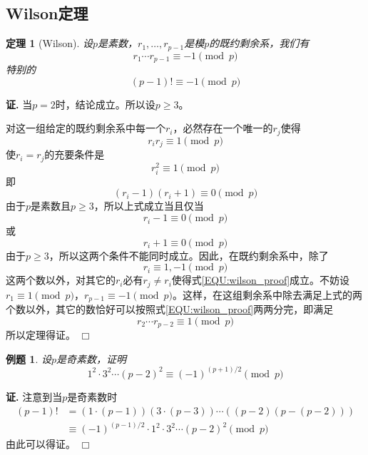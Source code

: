 \documentclass{ctexart}
\newtheorem{thrm}{定理}[section]
\newtheorem{exmp}{例题}[section]
\renewenvironment{proof}[1][证]{\noindent \textbf{#1.} }{\hfill$\Box$}
\begin{document}
\subsection{Wilson定理}
\begin{thrm}[Wilson]
设$p$是素数，$r_1,\dotsc,r_{p-1}$是模$p$的既约剩余系，我们有
\begin{displaymath}
r_1\dotsm r_{p-1}\equiv -1\pmod{p}
\end{displaymath}
特别的
\begin{displaymath}
(p-1)!\equiv -1\pmod{p}
\end{displaymath}
\end{thrm}
\begin{proof}
当$p=2$时，结论成立。所以设$p\geq 3$。

对这一组给定的既约剩余系中每一个$r_i$，必然存在一个唯一的$r_j$使得
\begin{equation}\label{EQU:wilson_proof}
r_i r_j\equiv 1\pmod{p}
\end{equation}
使$r_i=r_j$的充要条件是
\begin{displaymath}
r_i^2\equiv 1\pmod{p}
\end{displaymath}
即
\begin{displaymath}
(r_i-1)(r_i+1)\equiv 0\pmod{p}
\end{displaymath}
由于$p$是素数且$p\geq 3$，所以上式成立当且仅当
\begin{displaymath}
r_i-1\equiv 0\pmod{p}
\end{displaymath}
或
\begin{displaymath}
r_i+1\equiv 0\pmod{p}
\end{displaymath}
由于$p\geq 3$，所以这两个条件不能同时成立。因此，在既约剩余系中，除了
\begin{displaymath}
r_i\equiv 1,-1\pmod{p}
\end{displaymath}
这两个数以外，对其它的$r_i$必有$r_j\neq r_i$使得式\ref{EQU:wilson_proof}成立。不妨设$r_1\equiv 1\pmod{p}$，$r_{p-1}\equiv -1\pmod{p}$。这样，在这组剩余系中除去满足上式的两个数以外，其它的数恰好可以按照式\ref{EQU:wilson_proof}两两分完，即满足
\begin{displaymath}
r_2\dotsm r_{p-2}\equiv 1\pmod{p}
\end{displaymath}
所以定理得证。
\end{proof}

\begin{exmp}
设$p$是奇素数，证明
\begin{displaymath}
1^2\cdot 3^2\dotsm (p-2)^2\equiv (-1)^{(p+1)/2}\pmod{p}
\end{displaymath}
\end{exmp}
\begin{proof}
注意到当$p$是奇素数时
\begin{displaymath}
\begin{split}
(p-1)!&=(1\cdot(p-1))(3\cdot(p-3))\dotsm((p-2)(p-(p-2)))\\
      &\equiv(-1)^{(p-1)/2}\cdot 1^2 \cdot 3^2\dotsm (p-2)^2\pmod{p}
\end{split}
\end{displaymath}
由此可以得证。
\end{proof}
\end{document}
